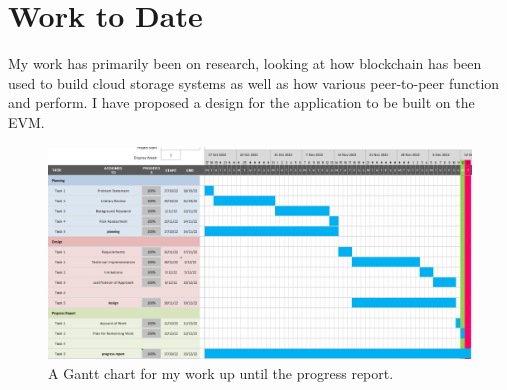 \section{Work to Date}

My work has primarily been on research, looking at how blockchain has been used to build cloud storage systems as well as how various peer-to-peer function and perform. 
I have proposed a design for the application to be built on the EVM. 

\begin{figure}[ht]
  \includegraphics[width=\textwidth]{assets/images/charts/gantt/progress.png}
  \caption{A Gantt chart for my work up until the progress report.}
\end{figure}
